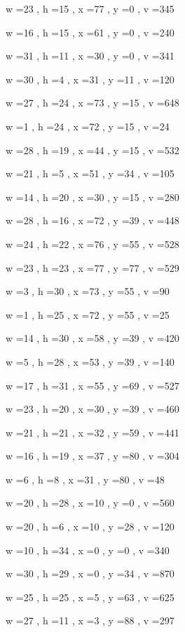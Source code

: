 \documentclass[11pt]{article}
\begin{document}
w =23 , h =15 , x =77 , y =0 , v =345
\par
w =16 , h =15 , x =61 , y =0 , v =240
\par
w =31 , h =11 , x =30 , y =0 , v =341
\par
w =30 , h =4 , x =31 , y =11 , v =120
\par
w =27 , h =24 , x =73 , y =15 , v =648
\par
w =1 , h =24 , x =72 , y =15 , v =24
\par
w =28 , h =19 , x =44 , y =15 , v =532
\par
w =21 , h =5 , x =51 , y =34 , v =105
\par
w =14 , h =20 , x =30 , y =15 , v =280
\par
w =28 , h =16 , x =72 , y =39 , v =448
\par
w =24 , h =22 , x =76 , y =55 , v =528
\par
w =23 , h =23 , x =77 , y =77 , v =529
\par
w =3 , h =30 , x =73 , y =55 , v =90
\par
w =1 , h =25 , x =72 , y =55 , v =25
\par
w =14 , h =30 , x =58 , y =39 , v =420
\par
w =5 , h =28 , x =53 , y =39 , v =140
\par
w =17 , h =31 , x =55 , y =69 , v =527
\par
w =23 , h =20 , x =30 , y =39 , v =460
\par
w =21 , h =21 , x =32 , y =59 , v =441
\par
w =16 , h =19 , x =37 , y =80 , v =304
\par
w =6 , h =8 , x =31 , y =80 , v =48
\par
w =20 , h =28 , x =10 , y =0 , v =560
\par
w =20 , h =6 , x =10 , y =28 , v =120
\par
w =10 , h =34 , x =0 , y =0 , v =340
\par
w =30 , h =29 , x =0 , y =34 , v =870
\par
w =25 , h =25 , x =5 , y =63 , v =625
\par
w =27 , h =11 , x =3 , y =88 , v =297
\par
\newpage
\end{document}

